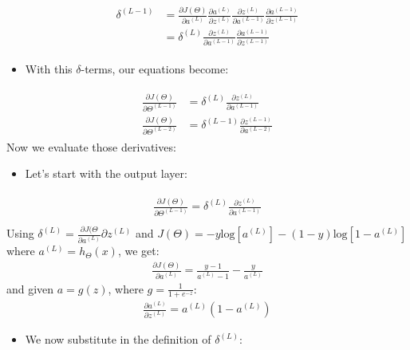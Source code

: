 \documentclass[a4paper,12pt]{report}
\begin{document}
\begin{appendices}
\begin{itemize}
\end{itemize}
\begin{align}
\begin{split}
\delta^{(L-1)} &=  \frac{\partial J(\Theta)}{\partial a^{(L)}}\frac{\partial a^{(L)}}{\partial z^{(L)}}\frac{\partial z^{(L)}}{\partial a^{(L-1)}}\frac{\partial a^{(L-1)}}{\partial z^{(L-1)}} \\
&=\delta^{(L)} \frac{\partial z^{(L)}}{\partial a^{(L-1)}}\frac{\partial a^{(L-1)}}{\partial z^{(L-1)}}
\end{split}
\end{align}
\begin{itemize}
\item With this $\delta$-terms, our equations become:
\end{itemize}
\begin{align}
\begin{split}
\frac{\partial J(\Theta)}{\partial \Theta^{(L-1)}} &=  \delta^{(L)}\frac{\partial z^{(L)}}{\partial a^{(L-1)}}\\
\frac{\partial J(\Theta)}{\partial \Theta^{(L-2)}} &= \delta^{(L-1)} \frac{\partial z^{(L-1)}}{\partial a^{(L-2)}}
\end{split}
\end{align}
Now we evaluate those derivatives:
\begin{itemize}
\item Let's start with the output layer:
\end{itemize}
\begin{align}
\begin{split}
\frac{\partial J(\Theta)}{\partial \Theta^{(L-1)}} =  \delta^{(L)}\frac{\partial z^{(L)}}{\partial a^{(L-1)}}\\
\end{split}
\end{align}
Using $\delta^{(L)} = \frac{\partial J(\Theta}{\partial a^{(L)}}{\partial z^{(L)}}$ and $J(\Theta) = -y \mathrm{log}[a^{(L)}] - (1-y)\mathrm{log}[1-a^{(L)}]$ where $a^{(L)}=h_{\Theta}(x)$, we get:
\begin{align}
\frac{\partial J(\Theta)}{\partial a^{(L)}} = \frac{y-1}{a^{(L)}-1} - \frac{y}{a^{(L)}}
\end{align}
and given $a=g(z)$, where $g=\frac{1}{1+e^{-z}}$:
\begin{align}
\frac{\partial a^{(L)}}{\partial z^{(L)}} = a^{(L)}(1- a^{(L)})
\end{align}
\begin{itemize}
\item We now substitute in the definition of $\delta^{(L)}$:

\end{itemize}
\end{appendices}
\end{document}
